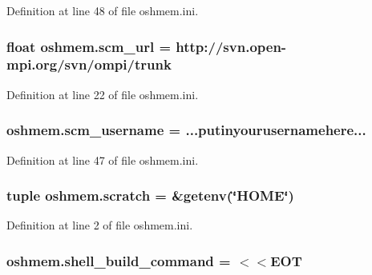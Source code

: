 Definition at line 48 of file oshmem.\-ini.

\hypertarget{namespaceoshmem_a6be12ee0b0ec67ddd588e8fe63960fa9}{
\subsubsection[{scm\-\_\-url}]{\setlength{\rightskip}{0pt plus 5cm}float oshmem.\-scm\-\_\-url = http\-://svn.\-open-\/mpi.\-org/svn/ompi/trunk}}\label{namespaceoshmem_a6be12ee0b0ec67ddd588e8fe63960fa9}


Definition at line 22 of file oshmem.\-ini.

\hypertarget{namespaceoshmem_a74a6a6021515def86f7d1b88ee967a42}{
\subsubsection[{scm\-\_\-username}]{\setlength{\rightskip}{0pt plus 5cm}oshmem.\-scm\-\_\-username = ...putinyourusernamehere...}}\label{namespaceoshmem_a74a6a6021515def86f7d1b88ee967a42}


Definition at line 47 of file oshmem.\-ini.

\hypertarget{namespaceoshmem_ac804c2050f1631747356112f02a6fa05}{
\subsubsection[{scratch}]{\setlength{\rightskip}{0pt plus 5cm}tuple oshmem.\-scratch = \&getenv(\char`\"{}H\-O\-M\-E\char`\"{})}}\label{namespaceoshmem_ac804c2050f1631747356112f02a6fa05}


Definition at line 2 of file oshmem.\-ini.

\hypertarget{namespaceoshmem_a2ef497db87796e4c84881171f8ba69bc}{
\subsubsection[{shell\-\_\-build\-\_\-command}]{\setlength{\rightskip}{0pt plus 5cm}oshmem.\-shell\-\_\-build\-\_\-command = $<$$<$E\-O\-T}}\label{namespaceoshmem_a2ef497db87796e4c84881171f8ba69bc}


